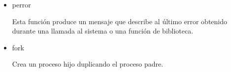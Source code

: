 	\begin{itemize}

		\item perror
	\begin{tcolorbox}
		Esta función produce un mensaje que describe al último error obtenido durante una llamada al sistema o una función de biblioteca.
	\end{tcolorbox}
		\item fork
	\begin{tcolorbox}
		Crea un proceso hijo duplicando el proceso padre.
	\end{tcolorbox}

	\end{itemize}

